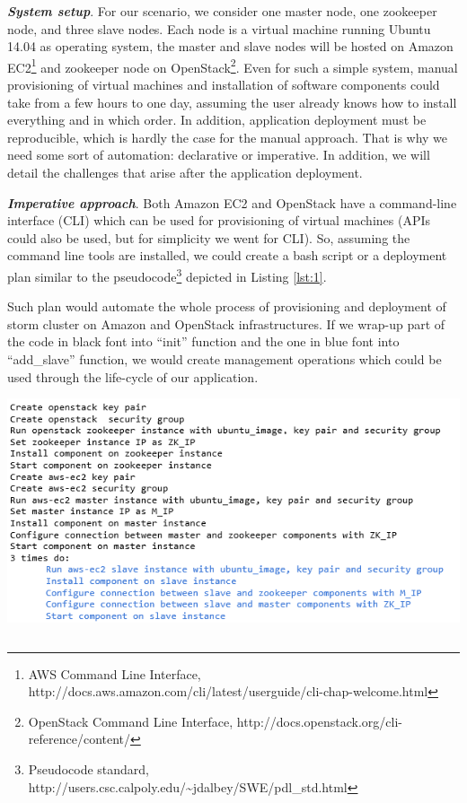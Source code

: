 \noindent \textbf{\textit{System setup}}. For our scenario, we consider one master node, one zookeeper node, and three slave nodes. Each node is a virtual machine running Ubuntu 14.04 as operating system, the master and slave nodes will be hosted on Amazon EC2\footnote{ AWS Command Line Interface, $  $http://docs.aws.amazon.com/cli/latest/userguide/cli-chap-welcome.html} and zookeeper node on OpenStack\footnote{ OpenStack Command Line Interface, $  $http://docs.openstack.org/cli-reference/content/}. Even for such a simple system, manual provisioning of virtual machines and installation of software components could take from a few hours to one day, assuming the user already knows how to install everything and in which order. In addition, application deployment must be reproducible, which is hardly the case for the manual approach. That is why we need some sort of automation: declarative or imperative. In addition, we will detail the challenges that arise after the application deployment.  

\noindent

\noindent \textbf{\textit{Imperative approach}}. Both Amazon EC2 and OpenStack have a command-line interface (CLI) which can be used for provisioning of virtual machines (APIs could also be used, but for simplicity we went for CLI). So, assuming the command line tools are installed, we could create a bash script or a deployment plan similar to the pseudocode\footnote{ Pseudocode standard, $  $http://users.csc.calpoly.edu/\~{}jdalbey/SWE/pdl\_std.html} depicted in Listing \ref{lst:1}.

\noindent Such plan would automate the whole process of provisioning and deployment of storm cluster on Amazon and OpenStack infrastructures. If we wrap-up part of the code in black font into ``init'' function and the one in blue font into ``add\_slave'' function, we would create management operations which could be used through the life-cycle of our application.

\begin{center}
	\includegraphics[width=38em]{./Figures/Imperative}
	\begin{lstlisting}[mathescape,caption={Imperative approach to deploy storm cluster},label={lst:1}]
	\end{lstlisting}
\end{center}

